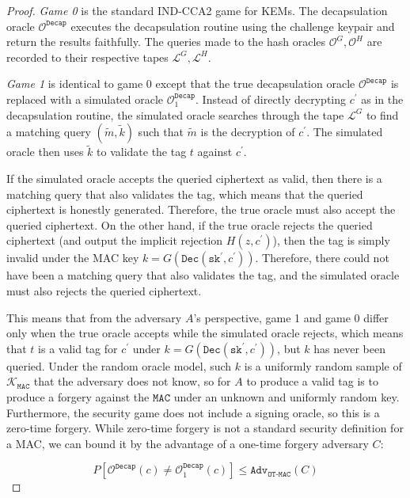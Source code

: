 \documentclass[journal=tches,submission]{iacrtrans}
\newcommand{\decrypt}{\texttt{Dec}}
\newcommand{\decap}{\texttt{Decap}}
\newcommand{\mac}{\texttt{MAC}}
\newcommand{\sk}{\texttt{sk}}
\newcommand{\adv}{\texttt{Adv}}
\begin{document}
\begin{proof}
    \emph{Game 0} is the standard IND-CCA2 game for KEMs. The decapsulation oracle $\mathcal{O}^\decap$ executes the decapsulation routine using the challenge keypair and return the results faithfully. The queries made to the hash oracles $\mathcal{O}^G, \mathcal{O}^H$ are recorded to their respective tapes $\mathcal{L}^G, \mathcal{L}^H$.

    \emph{Game 1} is identical to game 0 except that the true decapsulation oracle $\mathcal{O}^\decap$ is replaced with a simulated oracle $\mathcal{O}^\decap_1$. Instead of directly decrypting $c^\prime$ as in the decapsulation routine, the simulated oracle searches through the tape $\mathcal{L}^G$ to find a matching query $(\tilde{m}, \tilde{k})$ such that $\tilde{m}$ is the decryption of $c^\prime$. The simulated oracle then uses $\tilde{k}$ to validate the tag $t$ against $c^\prime$.

    If the simulated oracle accepts the queried ciphertext as valid, then there is a matching query that also validates the tag, which means that the queried ciphertext is honestly generated. Therefore, the true oracle must also accept the queried ciphertext. On the other hand, if the true oracle rejects the queried ciphertext (and output the implicit rejection $H(z, c^\prime)$), then the tag is simply invalid under the MAC key $k = G(\decrypt(\sk^\prime, c^\prime))$. Therefore, there could not have been a matching query that also validates the tag, and the simulated oracle must also rejects the queried ciphertext.

    This means that from the adversary $A$'s perspective, game 1 and game 0 differ only when the true oracle accepts while the simulated oracle rejects, which means that $t$ is a valid tag for $c^\prime$ under $k = G(\decrypt(\sk^\prime, c^\prime))$, but $k$ has never been queried. Under the random oracle model, such $k$ is a uniformly random sample of $\mathcal{K}_\mac$ that the adversary does not know, so for $A$ to produce a valid tag is to produce a forgery against the $\mac$ under an unknown and uniformly random key. Furthermore, the security game does not include a signing oracle, so this is a zero-time forgery. While zero-time forgery is not a standard security definition for a MAC, we can bound it by the advantage of a one-time forgery adversary $C$:

    \begin{equation*}
        P\left[\mathcal{O}^\decap(c) \neq \mathcal{O}^\decap_1(c)\right]
        \leq \adv_\texttt{OT-MAC}(C)
    \end{equation*}


\end{proof}
\end{document}
